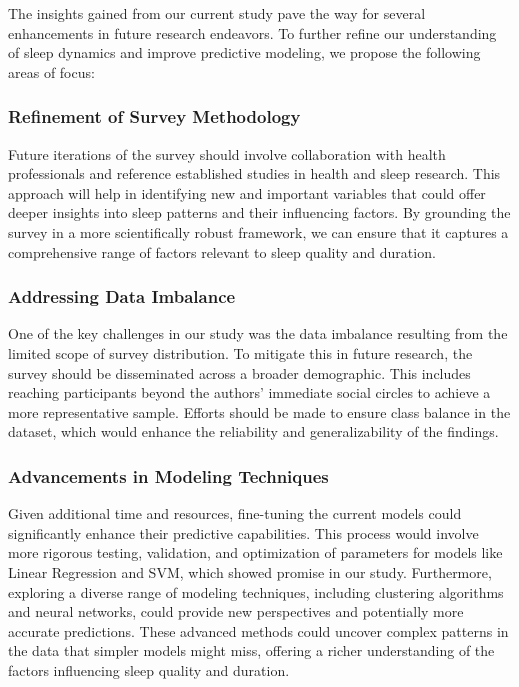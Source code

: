 \documentclass[conference]{IEEEtran}
\begin{document}
The insights gained from our current study pave the way for several enhancements in future research endeavors. To further refine our understanding of sleep dynamics and improve predictive modeling, we propose the following areas of focus:

\subsubsection*{Refinement of Survey Methodology}
Future iterations of the survey should involve collaboration with health professionals and reference established studies in health and sleep research. This approach will help in identifying new and important variables that could offer deeper insights into sleep patterns and their influencing factors. By grounding the survey in a more scientifically robust framework, we can ensure that it captures a comprehensive range of factors relevant to sleep quality and duration.

\subsubsection*{Addressing Data Imbalance}
One of the key challenges in our study was the data imbalance resulting from the limited scope of survey distribution. To mitigate this in future research, the survey should be disseminated across a broader demographic. This includes reaching participants beyond the authors' immediate social circles to achieve a more representative sample. Efforts should be made to ensure class balance in the dataset, which would enhance the reliability and generalizability of the findings.

\subsubsection*{Advancements in Modeling Techniques}
Given additional time and resources, fine-tuning the current models could significantly enhance their predictive capabilities. This process would involve more rigorous testing, validation, and optimization of parameters for models like Linear Regression and SVM, which showed promise in our study. Furthermore, exploring a diverse range of modeling techniques, including clustering algorithms and neural networks, could provide new perspectives and potentially more accurate predictions. These advanced methods could uncover complex patterns in the data that simpler models might miss, offering a richer understanding of the factors influencing sleep quality and duration.
\end{document}
